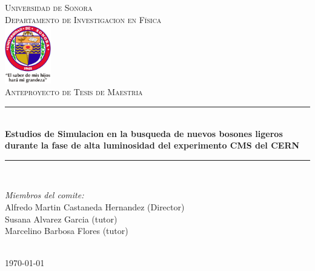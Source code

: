 \newcommand{\HRule}{\rule{\linewidth}{0.5mm}} 

\begin{titlepage}
\center
\textsc{
\Huge{Universidad de Sonora}\\[.5cm]
\Large
Departamento de Investigacion en Física\\[1cm] 
\includegraphics[width=2cm]{unison}\\[3cm]
Anteproyecto de Tesis de Maestria}\\[.7cm] 

\sffamily
\HRule \\[0.4cm]
\textbf{\LARGE Estudios de Simulacion en la busqueda de nuevos bosones ligeros durante la fase de alta luminosidad del experimento CMS del CERN}\\[0.2cm] 
\HRule \\[3cm]
 
\large
\begin{minipage}[t]{.6\textwidth}
\begin{flushleft}
\emph{Miembros del comite:}
\\
Alfredo Martin Castaneda Hernandez (Director)\\
Susana Alvarez Garcia (tutor)\\
Marcelino Barbosa Flores (tutor)\\
\end{flushleft}

\end{minipage}\hfill



\\[2cm]

{\today}\\[3cm]

\end{titlepage}


